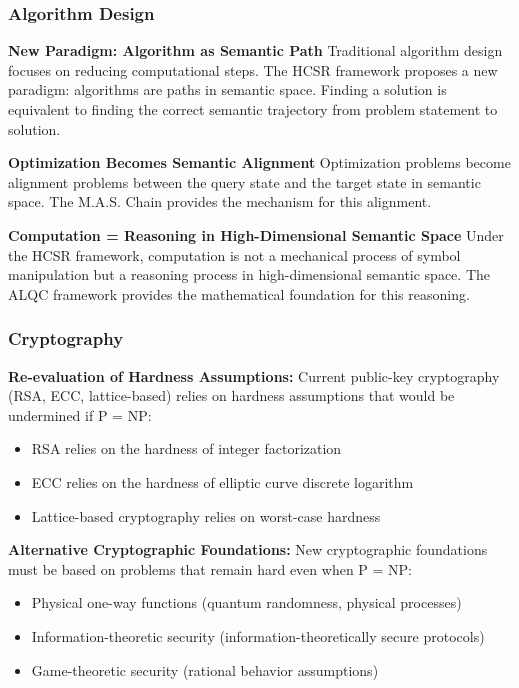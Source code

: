 \documentclass[11pt, letterpaper]{article}
\begin{document}
\subsubsection{Algorithm Design}

\textbf{New Paradigm: Algorithm as Semantic Path}
Traditional algorithm design focuses on reducing computational steps. The HCSR framework proposes a new paradigm: algorithms are paths in semantic space. Finding a solution is equivalent to finding the correct semantic trajectory from problem statement to solution.

\textbf{Optimization Becomes Semantic Alignment}
Optimization problems become alignment problems between the query state and the target state in semantic space. The M.A.S. Chain provides the mechanism for this alignment.

\textbf{Computation = Reasoning in High-Dimensional Semantic Space}
Under the HCSR framework, computation is not a mechanical process of symbol manipulation but a reasoning process in high-dimensional semantic space. The ALQC framework provides the mathematical foundation for this reasoning.

\subsubsection{Cryptography}

\textbf{Re-evaluation of Hardness Assumptions:}
Current public-key cryptography (RSA, ECC, lattice-based) relies on hardness assumptions that would be undermined if P = NP:
\begin{itemize}
    \item RSA relies on the hardness of integer factorization
    \item ECC relies on the hardness of elliptic curve discrete logarithm
    \item Lattice-based cryptography relies on worst-case hardness
\end{itemize}

\textbf{Alternative Cryptographic Foundations:}
New cryptographic foundations must be based on problems that remain hard even when P = NP:
\begin{itemize}
    \item Physical one-way functions (quantum randomness, physical processes)
    \item Information-theoretic security (information-theoretically secure protocols)
    \item Game-theoretic security (rational behavior assumptions)
\end{itemize}
\end{document}
